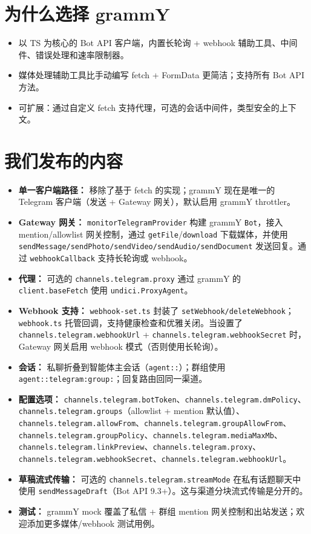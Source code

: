 \section{为什么选择 grammY}


\begin{itemize}
  \item 以 TS 为核心的 Bot API 客户端，内置长轮询 + webhook 辅助工具、中间件、错误处理和速率限制器。
  \item 媒体处理辅助工具比手动编写 fetch + FormData 更简洁；支持所有 Bot API 方法。
  \item 可扩展：通过自定义 fetch 支持代理，可选的会话中间件，类型安全的上下文。
\end{itemize}


\section{我们发布的内容}


\begin{itemize}
  \item \textbf{单一客户端路径：} 移除了基于 fetch 的实现；grammY 现在是唯一的 Telegram 客户端（发送 + Gateway 网关），默认启用 grammY throttler。
  \item \textbf{Gateway 网关：} \texttt{monitorTelegramProvider} 构建 grammY \texttt{Bot}，接入 mention/allowlist 网关控制，通过 \texttt{getFile}/\texttt{download} 下载媒体，并使用 \texttt{sendMessage/sendPhoto/sendVideo/sendAudio/sendDocument} 发送回复。通过 \texttt{webhookCallback} 支持长轮询或 webhook。
  \item \textbf{代理：} 可选的 \texttt{channels.telegram.proxy} 通过 grammY 的 \texttt{client.baseFetch} 使用 \texttt{undici.ProxyAgent}。
  \item \textbf{Webhook 支持：} \texttt{webhook-set.ts} 封装了 \texttt{setWebhook/deleteWebhook}；\texttt{webhook.ts} 托管回调，支持健康检查和优雅关闭。当设置了 \texttt{channels.telegram.webhookUrl} + \texttt{channels.telegram.webhookSecret} 时，Gateway 网关启用 webhook 模式（否则使用长轮询）。
  \item \textbf{会话：} 私聊折叠到智能体主会话（\texttt{agent::}）；群组使用 \texttt{agent::telegram:group:}；回复路由回同一渠道。
  \item \textbf{配置选项：} \texttt{channels.telegram.botToken}、\texttt{channels.telegram.dmPolicy}、\texttt{channels.telegram.groups}（allowlist + mention 默认值）、\texttt{channels.telegram.allowFrom}、\texttt{channels.telegram.groupAllowFrom}、\texttt{channels.telegram.groupPolicy}、\texttt{channels.telegram.mediaMaxMb}、\texttt{channels.telegram.linkPreview}、\texttt{channels.telegram.proxy}、\texttt{channels.telegram.webhookSecret}、\texttt{channels.telegram.webhookUrl}。
  \item \textbf{草稿流式传输：} 可选的 \texttt{channels.telegram.streamMode} 在私有话题聊天中使用 \texttt{sendMessageDraft}（Bot API 9.3+）。这与渠道分块流式传输是分开的。
  \item \textbf{测试：} grammY mock 覆盖了私信 + 群组 mention 网关控制和出站发送；欢迎添加更多媒体/webhook 测试用例。
\end{itemize}



